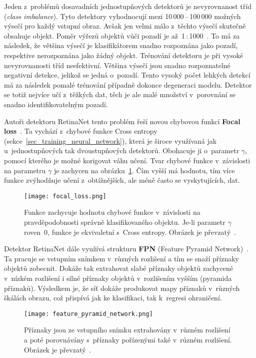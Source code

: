Jeden z~problémů dosavadních jednostupňových detektorů je nevyrovnanost tříd (\textit{class imbalance}). Tyto detektory vyhodnocují mezi 10\,000\,--\,100\,000 možných výsečí pro každý vstupní obraz. Avšak jen velmi málo z~těchto výsečí skutečně obsahuje objekt. Poměr výřezů objektů vůči pozadí je až~1\,:\,1000~\cite{paperFocalLoss}. To má za následek, že většina výsečí je klasifikátorem snadno rozpoznána jako pozadí, respektive nerozpoznána jako žádný objekt. Trénování detektoru je při vysoké nevyrovnanosti tříd neefektivní. Většina výsečí jsou snadno rozpoznatelné negativní detekce, jelikož se jedná o~pozadí. Tento vysoký počet lehkých detekcí má za následek pomalé trénování případně dokonce degeneraci modelu. Detektor se totiž nejvíce učí z~těžkých dat, těch je ale malé množství v~porovnání se snadno identifikovatelným pozadí.

Autoři detektoru RetinaNet tento problém řeší novou chybovou funkcí \textbf{Focal loss}~\cite{paperFocalLoss}. Ta vychází z~chybové funkce Cross entropy (sekce~\ref{sec_training_neural_network}), která je široce využívaná jak u~jednostupňových tak dvoustupňových detektorů. Obohacuje ji o~parametr $\gamma$, pomocí kterého je možné korigovat váhu učení. Tvar chybové funkce v~závislosti na parametru $\gamma$ je zachycen na obrázku~\ref{fig_focal_loss}. Čím vyšší má hodnotu, tím více funkce zvýhodňuje učení z~obtížnějších, ale méně často se vyskytujících, dat.

\begin{figure}[H]
    \centering
    \texttt{[image: focal\_loss.png]}
    \caption[Chybová funkce Focal loss]{Funkce zachycuje hodnotu chybové funkce v~závislosti na pravděpodobnosti správně klasifikovaného objektu. Je-li parametr $\gamma$ roven~$0$, funkce je ekvivaletní s~Cross entropy. Obrázek je převzatý~\cite{paperFocalLoss}.}
    \label{fig_focal_loss}
\end{figure}

Detektor RetinaNet dále využívá strukturu \textbf{FPN} (Feature Pyramid Network)~\cite{paperFpn}. Ta pracuje se vstupním snímkem v~různých rozlišení a tím se snaží příznaky objektů zobecnit. Dokáže tak extrahovat slabé příznaky objektů zachycené v~nízkém rozlišení i silné příznaky objektů v~rozlišením vyšším (pyramida příznaků). Výsledkem je, že síť dokáže produkovat mapy příznaků v~různých škálách obrazu, což přispívá jak ke klasifikaci, tak k~regresi ohraničení.

\begin{figure}[H]
    \centering
    \texttt{[image: feature\_pyramid\_network.png]}
    \caption[Schéma Feature Pyramid Network]{Příznaky jsou ze vstupního snímku extrahovány v~různém rozlišení a poté porovnávány s~příznaky pořízenými také v~různém rozlišení. Obrázek je převzatý~\cite{paperFpn}.}
    \label{fig_feature_pyramid_network}
\end{figure}

